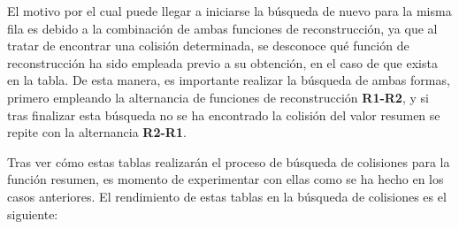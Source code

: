 \documentclass[12pt,spanish,listoffigures,listoftables,listofalgorithms]{tfgetsinf}
\begin{document}
El motivo por el cual puede llegar a iniciarse la búsqueda de nuevo para la misma fila es debido a la combinación de ambas funciones de reconstrucción, ya que al tratar de encontrar una colisión determinada, se desconoce qué función de reconstrucción ha sido empleada previo a su obtención, en el caso de que exista en la tabla. De esta manera, es importante realizar la búsqueda de ambas formas, primero empleando la alternancia de funciones de reconstrucción \textbf{R1-R2}, y si tras finalizar esta búsqueda no se ha encontrado la colisión del valor resumen se repite con la alternancia \textbf{R2-R1}.

Tras ver cómo estas tablas realizarán el proceso de búsqueda de colisiones para la función resumen, es momento de experimentar con ellas como se ha hecho en los casos anteriores. El rendimiento de estas tablas en la búsqueda de colisiones es el siguiente:
\end{document}
